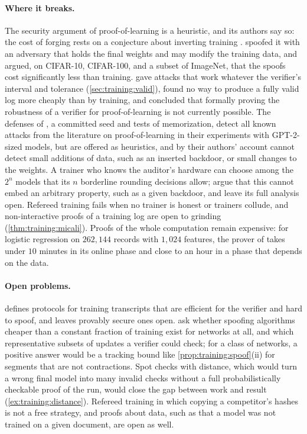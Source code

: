 \begin{refsection}
\paragraph{Where it breaks.} The security argument of proof-of-learning is a heuristic, and its authors say so: the cost of forging rests on a conjecture about inverting training \parencite{JiaEtAl2021}. \Textcite{ZhangEtAl2022} spoofed it with an adversary that holds the final weights and may modify the training data, and argued, on CIFAR-10, CIFAR-100, and a subset of ImageNet, that the spoofs cost significantly less than training. \Textcite{FangEtAl2023} gave attacks that work whatever the verifier's interval and tolerance (\cref{sec:training:valid}), found no way to produce a fully valid log more cheaply than by training, and concluded that formally proving the robustness of a verifier for proof-of-learning is not currently possible. The defenses of \textcite{ChoiShavitDuvenaud2023}, a committed seed and tests of memorization, detect all known attacks from the literature on proof-of-learning in their experiments with GPT-2-sized models, but are offered as heuristics, and by their authors' account cannot detect small additions of data, such as an inserted backdoor, or small changes to the weights. A trainer who knows the auditor's hardware can choose among the $2^n$ models that its $n$ borderline rounding decisions allow; \textcite{SrivastavaAroraBoneh2024} argue that this cannot embed an arbitrary property, such as a given backdoor, and leave its full analysis open. Refereed training fails when no trainer is honest or trainers collude, and non-interactive proofs of a training log are open to grinding (\cref{thm:training:micali}). Proofs of the whole computation remain expensive: for logistic regression on $262{,}144$ records with $1{,}024$ features, the prover of \textcite{GargEtAl2023} takes under $10$ minutes in its online phase and close to an hour in a phase that depends on the data.

\paragraph{Open problems.} \Textcite{Shavit2023} defines protocols for training transcripts that are efficient for the verifier and hard to spoof, and leaves provably secure ones open. \Textcite{FangEtAl2023} ask whether spoofing algorithms cheaper than a constant fraction of training exist for networks at all, and which representative subsets of updates a verifier could check; for a class of networks, a positive answer would be a tracking bound like \cref{prop:training:spoof}(ii) for segments that are not contractions. Spot checks with distance, which would turn a wrong final model into many invalid checks without a full probabilistically checkable proof of the run, would close the gap between work and result (\cref{ex:training:distance}). Refereed training in which copying a competitor's hashes is not a free strategy, and proofs about data, such as that a model was not trained on a given document, are open as well.


\end{refsection}
